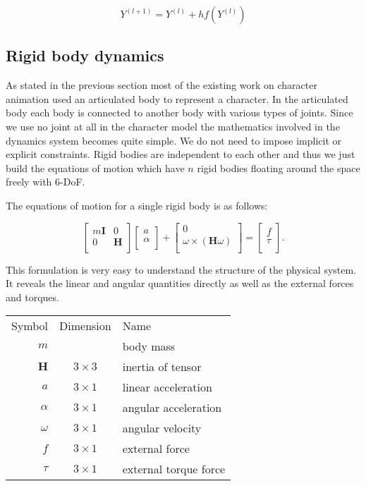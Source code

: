 \documentclass[a4paper,10pt]{article}
\begin{document}
\begin{equation}
Y^{(l+1)}=Y^{(l)}+hf(Y^{(l)})
\end{equation}

\subsection{Rigid body dynamics}

As stated in the previous section most of the existing work on
character animation used an articulated body to represent a character.
In the articulated body each body is connected to another body with
various types of joints. Since we use no joint at all in the character
model the mathematics involved in the dynamics system becomes quite
simple. We do not need to impose implicit or explicit constraints.
Rigid bodies are independent to each other and thus we just build the
equations of motion which have $n$ rigid bodies floating around the
space freely with 6-DoF.

The equations of motion for a single rigid body is as follows:

\begin{equation}
\left[ {\begin{array}{cc}
 m\mathbf{I}  &  0 \\
 0            & \mathbf{H}  \\
 \end{array} } \right]
 \left[ {\begin{array}{c}
 a  \\
 \alpha              \\
 \end{array} } \right]
 +
 \left[ {\begin{array}{c}
 0  \\
 \omega\times(\mathbf{H}\omega)   \\
 \end{array} } \right]
 =
 \left[ {\begin{array}{c}
 f  \\
 \tau   \\
 \end{array} } \right].
\end{equation}

This formulation is very easy to understand the structure of
the physical system. It reveals the linear and angular quantities
directly as well as the external forces and torques.


\begin{tabular}{ r c l }
Symbol       & Dimension  & Name \\
$m$          &            & body mass \\
$\mathbf{H}$ & $3\times3$ & inertia of tensor \\
$a$          & $3\times1$ & linear acceleration \\ 
$\alpha$     & $3\times1$ & angular acceleration \\
$\omega$     & $3\times1$ & angular velocity \\
$f$          & $3\times1$ & external force\\
$\tau$       & $3\times1$ & external torque force\\
\end{tabular}
\end{document}
